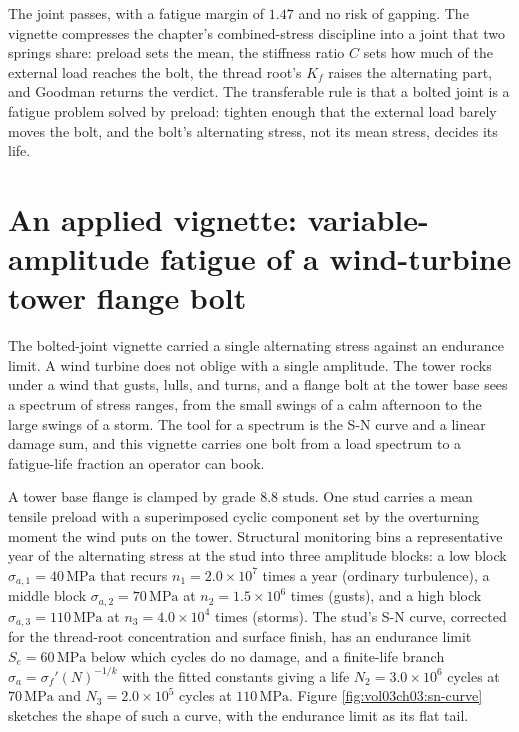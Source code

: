 The joint passes, with a fatigue margin of $1.47$ and no risk of gapping.
The vignette compresses the chapter's combined-stress discipline into a
joint that two springs share: preload sets the mean, the stiffness ratio
$C$ sets how much of the external load reaches the bolt, the thread root's
$K_f$ raises the alternating part, and Goodman returns the verdict. The
transferable rule is that a bolted joint is a fatigue problem solved by
preload: tighten enough that the external load barely moves the bolt, and
the bolt's alternating stress, not its mean stress, decides its life.

\section{An applied vignette: variable-amplitude fatigue of a
wind-turbine tower flange bolt}

The bolted-joint vignette carried a single alternating stress against an
endurance limit. A wind turbine does not oblige with a single amplitude.
The tower rocks under a wind that gusts, lulls, and turns, and a flange
bolt at the tower base sees a spectrum of stress ranges, from the small
swings of a calm afternoon to the large swings of a storm. The tool for a
spectrum is the S-N curve and a linear damage sum, and this vignette carries
one bolt from a load spectrum to a fatigue-life fraction an operator can
book.

A tower base flange is clamped by grade 8.8 studs. One stud carries a
mean tensile preload with a superimposed cyclic component set by the
overturning moment the wind puts on the tower. Structural monitoring bins
a representative year of the alternating stress at the stud into three
amplitude blocks: a low block $\sigma_{a,1} = 40\,\text{MPa}$ that recurs
$n_1 = 2.0\times 10^7$ times a year (ordinary turbulence), a middle block
$\sigma_{a,2} = 70\,\text{MPa}$ at $n_2 = 1.5\times 10^6$ times (gusts),
and a high block $\sigma_{a,3} = 110\,\text{MPa}$ at $n_3 = 4.0\times 10^4$
times (storms). The stud's S-N curve, corrected for the thread-root
concentration and surface finish, has an endurance limit $S_e =
60\,\text{MPa}$ below which cycles do no damage, and a finite-life branch
$\sigma_a = \sigma_f' (N)^{-1/k}$ with the fitted constants giving a life
$N_2 = 3.0\times 10^6$ cycles at $70\,\text{MPa}$ and $N_3 = 2.0\times
10^5$ cycles at $110\,\text{MPa}$. Figure \ref{fig:vol03ch03:sn-curve}
sketches the shape of such a curve, with the endurance limit as its flat
tail.

